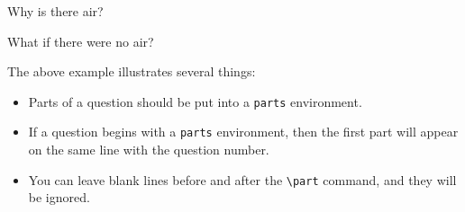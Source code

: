 \documentclass[12pt]{exam}
\makeatletter
\newcommand{\indt}[1]{\index{#1@\texttt{#1}}}
\makeatother
\begin{document}
\begin{questions}
\question
Why is there air?

\question
What if there were no air?


\question



\end{questions}

\bigskip

The above example illustrates several things:
\begin{itemize}
\item Parts of a question should be put into a
  \verb"parts"\indt{parts}%
   environment.
\item If a question begins with a \verb"parts" environment, then the
  first part will appear on the same line with the question number.
\item You can leave blank
  lines before and after the \verb"\part" command,
  and they will be ignored.
\end{itemize}

\bigskip
\end{document}
